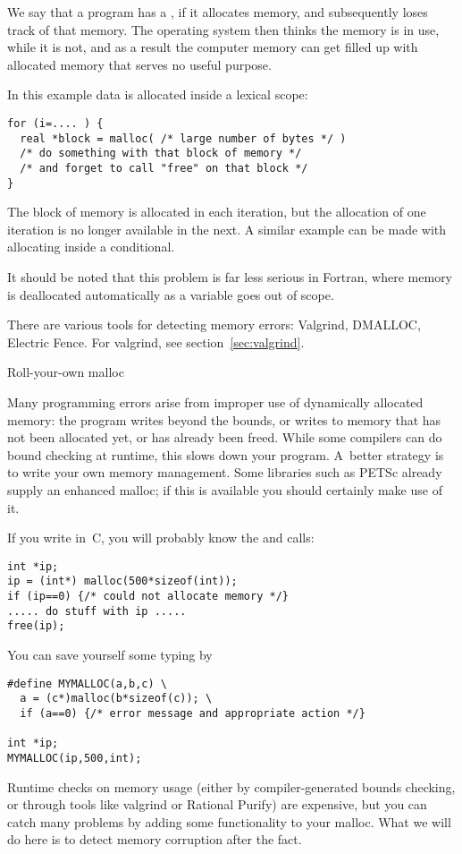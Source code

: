 We say that a program has a , if it allocates
memory, and subsequently loses track of that memory. The operating
system then thinks the memory is in use, while it is not, and as a
result the computer memory can get filled up with allocated memory
that serves no useful purpose.

In this example data is allocated inside a lexical scope:
\begin{verbatim}
for (i=.... ) {
  real *block = malloc( /* large number of bytes */ )
  /* do something with that block of memory */
  /* and forget to call "free" on that block */
}
\end{verbatim}
The block of memory is allocated in each iteration, but the allocation
of one iteration is no longer available in the next. A similar example
can be made with allocating inside a conditional. 

It should be noted
that this problem is far less serious in Fortran, where memory is
deallocated automatically as a variable goes out of scope.

There are various tools for detecting memory errors: Valgrind,
DMALLOC, Electric Fence. For valgrind, see section~\ref{sec:valgrind}.

 {Roll-your-own malloc}

Many programming errors arise from improper use of dynamically
allocated memory: the program writes beyond the bounds, or writes to
memory that has not been allocated yet, or has already been
freed. While some compilers can do bound checking at runtime, this
slows down your program. A~better strategy is to write your own memory
management. Some libraries such as PETSc already supply an enhanced
malloc; if this is available you should certainly make use of it.

If you write in~C, you will probably know the  and  calls:
\begin{verbatim}
int *ip;
ip = (int*) malloc(500*sizeof(int));
if (ip==0) {/* could not allocate memory */}
..... do stuff with ip .....
free(ip);
\end{verbatim}
You can save yourself some typing by
\begin{verbatim}
#define MYMALLOC(a,b,c) \
  a = (c*)malloc(b*sizeof(c)); \
  if (a==0) {/* error message and appropriate action */}

int *ip;
MYMALLOC(ip,500,int);
\end{verbatim}

Runtime checks on memory usage (either by compiler-generated bounds
checking, or through tools like
valgrind or Rational Purify) are expensive, but you can catch many
problems by adding some functionality to your malloc.
What we will do here is to detect memory corruption
after the fact. 

